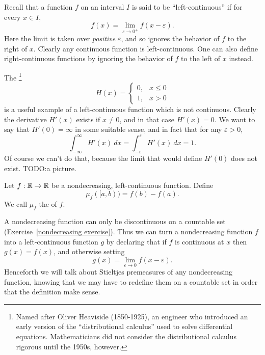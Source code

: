 \begin{subsec}
Recall that a function $f$ on an interval $I$ is said to be ``left-continuous'' if for every $x \in I$,
\[f(x) = \lim_{\varepsilon \to 0^+} f(x - \varepsilon).\]
Here the limit is taken over \emph{positive} $\varepsilon$, and so ignores the behavior of $f$ to the right of $x$.
Clearly any continuous function is left-continuous.
One can also define right-continuous functions by ignoring the behavior of $f$ to the left of $x$ instead.
\end{subsec}

\begin{example}
The \footnote{Named after Oliver Heaviside (1850-1925), an engineer who introduced an early version of the ``distributional calculus'' used to solve differential equations. Mathematicians did not consider the distributional calculus rigorous until the 1950s, however.}
$$H(x) = \begin{cases}
0, & x \leq 0\\
1, & x > 0
\end{cases}$$
is a useful example of a left-continuous function which is not continuous.
Clearly the derivative $H'(x)$ exists if $x \neq 0$, and in that case $H'(x) = 0$.
We want to say that $H'(0) = \infty$ in some suitable sense, and in fact that for any $\varepsilon > 0$,
\[\int_{-\infty}^{\infty} H'(x)~dx = \int_{-\varepsilon}^{\varepsilon} H'(x)~dx = 1.\]
Of course we can't do that, because the limit that would define $H'(0)$ does not exist.
TODO:\@Draw a picture.
\end{example}

\begin{definition}
Let $f: \mathbb{R} \to \mathbb{R}$ be a nondecreasing, left-continuous function.
Define
\[\mu_f([a, b)) = f(b) - f(a).\]
We call $\mu_f$ the  of $f$.
\end{definition}

\begin{subsec}
A nondecreasing function can only be discontinuous on a countable set (Exercise~\ref{nondecreasing exercise}).
Thus we can turn a nondecreasing function $f$ into a left-continuous function $g$ by declaring that if $f$ is continuous at $x$ then $g(x) = f(x)$, and otherwise setting
\[g(x) = \lim_{\varepsilon \to 0} f(x - \varepsilon).\]
Henceforth we will talk about Stieltjes premeasures of any nondecreasing function, knowing that we may have to redefine them on a countable set in order that the definition make sense.
\end{subsec}

